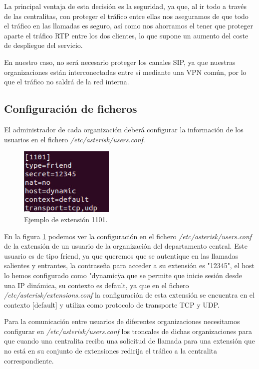 \documentclass[a4paper]{article}
\begin{document}
 
La principal ventaja de esta decisión es la seguridad, ya que, al ir todo a través de las centralitas, con proteger el tráfico entre ellas nos aseguramos de que todo el tráfico en las llamadas es seguro, así como nos ahorramos el tener que proteger aparte el tráfico RTP entre los dos clientes, lo que supone un aumento del coste de despliegue del servicio. 


 En nuestro caso, no será necesario proteger los canales SIP, ya que nuestras organizaciones están interconectadas entre sí mediante una VPN común, por lo que el tráfico no saldrá de la red interna.

\subsection{Configuración de ficheros}\label{Confich}
El administrador de cada organización deberá configurar la información de los usuarios en el fichero \textit{/etc/asterisk/users.conf}. 


\begin{figure}[htb]
    
    \begin{center}
        \includegraphics[width=0.4\textwidth]{1101.jpg}
         \caption{Ejemplo de extensión 1101.}
         \label{fig:1101}
    \end{center}
\end{figure}

\newpage
 En la figura \ref{fig:1101} podemos ver la configuración en el fichero \textit{/etc/asterisk/users.conf} de la extensión de un usuario de la organización del departamento central. Este usuario es de tipo friend, ya que queremos que se autentique en las llamadas salientes y entrantes, la contraseña para acceder a su extensión es "12345", el host lo hemos configurado como "dynamic\" ya que se permite que inicie sesión desde una IP dinámica, su contexto es default, ya que en el fichero \textit{/etc/asterisk/extensions.conf} la configuración de esta extensión se encuentra en el contexto [default] y utiliza como protocolo de transporte TCP y UDP.


 Para la comunicación entre usuarios de diferentes organizaciones necesitamos configurar en \textit{/etc/asterisk/users.conf} los troncales de dichas organizaciones para que cuando una centralita reciba una solicitud de llamada para una extensión que no está en su conjunto de extensiones redirija el tráfico a la centralita correspondiente. 
\end{document}
